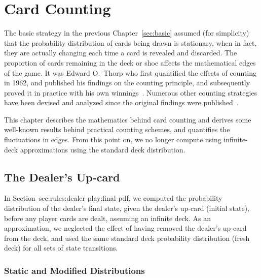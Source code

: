 
\chapter{Card Counting}
\label{sec:counting}

The basic strategy in the previous Chapter~\ref{sec:basic}
assumed (for simplicity) that the probability distribution
of cards being drawn is stationary, when in fact, 
they are actually changing each time a card is revealed and discarded.
The proportion of cards remaining in the deck or shoe
affects the mathematical edges of the game.
It was Edward O.\ Thorp who first quantified the effects of counting in 1962, 
and published his findings on the counting principle,
and subsequently proved it in practice
with his own winnings~\cite{ref:thorp62}.  
Numerous other counting strategies have been devised and analyzed since 
the original findings were 
published~\cite{ref:wong81, ref:uston98, ref:griffin99, ref:carlson10}.

This chapter describes the mathematics behind card counting
and derives some well-known results behind practical counting schemes, 
and quantifies the fluctuations in edges.  
From this point on, we no longer compute using infinite-deck
approximations using the standard deck distribution.  

\section{The Dealer's Up-card}
\label{sec:counting:dealer-up}

In Section~{sec:rules:dealer-play:final-pdf}, 
we computed the probability distribution of the 
dealer's final state, given the dealer's up-card (initial state), 
before any player cards are dealt,
assuming an infinite deck.
As an approximation, we neglected the effect of having removed
the dealer's up-card from the deck, and used the same 
standard deck probability distribution (fresh deck) for all sets of 
state transitions.

\subsection{Static and Modified Distributions}
\label{sec:counting:dealer-up:static}

